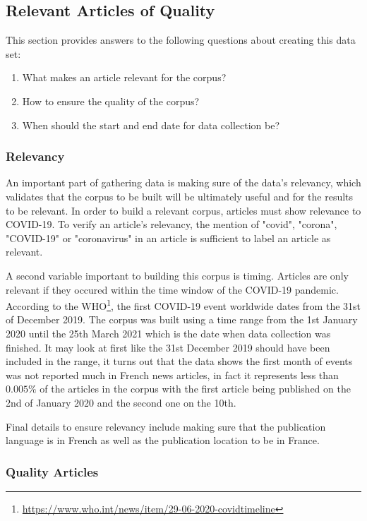 \subsection{Relevant Articles of Quality}

This section provides answers to the following questions about creating this data set:
\begin{enumerate}
    \item What makes an article relevant for the corpus?
    \item How to ensure the quality of the corpus?
    \item When should the start and end date for data collection be?
\end{enumerate}

\subsubsection{Relevancy}

An important part of gathering data is making sure of the data's relevancy, which validates that the corpus to be built will be ultimately useful and for the results to be relevant. In order to build a relevant corpus, articles must show relevance to COVID-19. To verify an article's relevancy, the mention of "covid", "corona", "COVID-19" or "coronavirus" in an article is sufficient to label an article as relevant.

A second variable important to building this corpus is timing. Articles are only relevant if they occured within the time window of the COVID-19 pandemic. According to the WHO\footnote{\url{https://www.who.int/news/item/29-06-2020-covidtimeline}}, the first COVID-19 event worldwide dates from the 31st of December 2019. The corpus was built using a time range from the 1st January 2020 until the 25th March 2021 which is the date when data collection was finished. It may look at first like the 31st December 2019 should have been included in the range, it turns out that the data shows the first month of events was not reported much in French news articles, in fact it represents less than $0.005\%$ of the articles in the corpus with the first article being published on the 2nd of January 2020 and the second one on the 10th.

Final details to ensure relevancy include making sure that the publication language is in French as well as the publication location to be in France.

\subsubsection{Quality Articles}

